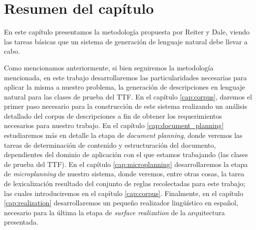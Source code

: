 \section{Resumen del capítulo}
En este capítulo presentamos la metodología propuesta por Reiter y Dale, viendo las tareas básicas que un sistema de generación de lenguaje natural debe llevar a cabo. 

Como mencionamos anteriormente, si bien seguiremos la metodología mencionada, en este trabajo desarrollaremos las particularidades necesarias para aplicar la misma a nuestro problema, la generación de descripciones en lenguaje natural para las clases de prueba del TTF. En el capítulo \ref{cap:corpus}, daremos el primer paso necesario para la construcción de este sistema realizando un análisis detallado del corpus de descripciones a fin de obtener los requerimientos necesarios para nuestro trabajo. En el capítulo \ref{cap:document_planning} estudiaremos más en detalle la etapa de \textit{document planning}, donde veremos las tareas de determinación de contenido y estructuración del documento, dependientes del dominio de aplicación con el que estamos trabajando (las clases de prueba del TTF). En el capítulo \ref{cap:microplanning} desarrollaremos la etapa de \textit{microplanning} de nuestro sistema, donde veremos, entre otras cosas, la tarea de lexicalización resultado del conjunto de reglas recolectadas para este trabajo; las cuales introduciremos en el capítulo \ref{cap:corpus}. Finalmente, en el capítulo \ref{cap:realization} desarrollaremos un pequeño realizador lingüístico en español, necesario para la última la etapa de \textit{surface realization} de la arquitectura presentada.

